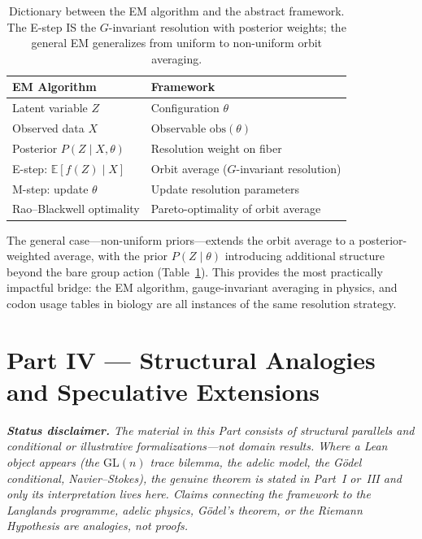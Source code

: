 \documentclass[11pt,a4paper]{article}
\newcommand{\E}{\mathbb{E}}
\begin{document}
\begin{table}[t]
  \centering
  \small
  \begin{tabular}{@{}ll@{}}
    \toprule
    \textbf{EM Algorithm} & \textbf{Framework} \\
    \midrule
    Latent variable $Z$ & Configuration $\theta$ \\
    Observed data $X$ & Observable $\mathrm{obs}(\theta)$ \\
    Posterior $P(Z \mid X, \theta)$ & Resolution weight on fiber \\
    E-step: $\E[f(Z) \mid X]$ & Orbit average ($G$-invariant resolution) \\
    M-step: update $\theta$ & Update resolution parameters \\
    Rao--Blackwell optimality & Pareto-optimality of orbit average \\
    \bottomrule
  \end{tabular}
  \caption{Dictionary between the EM algorithm and the abstract framework.  The
    E-step IS the $G$-invariant resolution with posterior weights; the general
    EM generalizes from uniform to non-uniform orbit averaging.}
  \label{tab:em-dictionary}
\end{table}

The general case---non-uniform priors---extends the orbit average to a
posterior-weighted average, with the prior $P(Z \mid \theta)$ introducing
additional structure beyond the bare group action
(Table~\ref{tab:em-dictionary}).  This provides the most practically impactful
bridge: the EM algorithm, gauge-invariant averaging in physics, and codon
usage tables in biology are all instances of the same resolution strategy.


\clearpage
\part{Part IV \textnormal{\large --- Structural Analogies and Speculative Extensions}}
\noindent\emph{\textbf{Status disclaimer.} The material in this Part consists of structural parallels and conditional or illustrative formalizations---\emph{not} domain results. Where a Lean object appears (the $\mathrm{GL}(n)$ trace bilemma, the adelic model, the G\"odel conditional, Navier--Stokes), the genuine theorem is stated in Part~I or~III and only its \emph{interpretation} lives here. Claims connecting the framework to the Langlands programme, adelic physics, G\"odel's theorem, or the Riemann Hypothesis are analogies, not proofs.}\par\medskip
\end{document}
